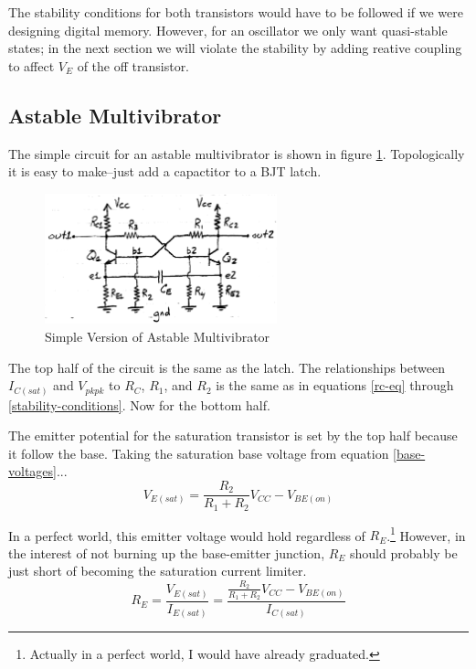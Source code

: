 \documentclass[titlepage, letterpaper, 10.5pt]{article}
\begin{document}
The stability conditions for both transistors would have to be followed if we were
designing digital memory. However, for an oscillator we only want quasi-stable states;
in the next section we will violate the stability by adding reative coupling to affect $V_{E}$ of the off transistor.

\clearpage
\subsection{Astable Multivibrator}
\label{astable-multivibrator}

The simple circuit for an astable multivibrator is shown in figure \ref{simple-circuit-diagram}.
Topologically it is easy to make--just add a capactitor to a BJT latch.

\begin{figure}[ht]
	\centering
	\includegraphics[width=0.6\textwidth]{diagrams/simple-circuit}
	\caption{Simple Version of Astable Multivibrator}
	\label{simple-circuit-diagram}
\end{figure}

The top half of the circuit is the same as the latch.
The relationships between $I_{C(sat)}$ and $V_{pkpk}$ to $R_{C}$, $R_{1}$, and $R_{2}$
is the same as in equations \ref{rc-eq} through \ref{stability-conditions}.
Now for the bottom half.

The emitter potential for the saturation transistor is set by the top half because
it follow the base. Taking the saturation base voltage from equation \ref{base-voltages}...
\begin{equation}
V_{E(sat)}=\frac{R_{2}}{R_{1}+R_{2}}V_{CC}-V_{BE(on)}
\end{equation}

In a perfect world,
this emitter voltage would hold regardless of $R_{E}$.\footnote{Actually in a perfect world, I would have already graduated.}
However, in the interest of not burning up the base-emitter junction, $R_{E}$
should probably be just short of becoming the saturation current limiter.
\begin{equation}
R_{E}=\frac{V_{E(sat)}}{I_{E(sat)}}=\frac{\frac{R_{2}}{R_{1}+R_{2}}V_{CC}-V_{BE(on)}}{I_{C(sat)}}
\label{re-eq}
\end{equation}
\end{document}
